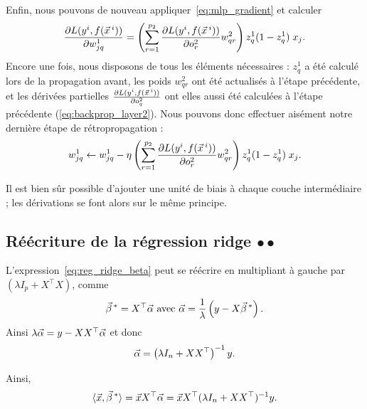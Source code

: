 \begin{exemple}
  Enfin, nous pouvons de nouveau appliquer~\ref{eq:mlp_gradient} et calculer 
  \begin{equation*}
    \frac{\partial L(y^i, f(\xx^i))}{\partial w^1_{jq}} =  
    \left(\sum_{r=1}^{p_2}  \frac{\partial L(y^i, f(\xx^i))}{\partial o^2_r}  
      w^2_{qr} \right) z^1_q (1 - z^1_q) \; x_j.
  \end{equation*}
  Encore une fois, nous disposons de tous les éléments nécessaires : $z_q^1$
  a été calculé lors de la propagation avant, les poids $w^2_{qr}$ ont été
  actualisés à l'étape précédente, et les dérivées partielles $\frac{\partial
    L(y^i, f(\xx^i))}{\partial o^2_q}$ ont elles aussi été calculées à
  l'étape précédente (\ref{eq:backprop_layer2}). Nous pouvons donc effectuer
  aisément notre dernière étape de rétropropagation :
  \begin{equation*}
    w^1_{jq} \leftarrow w^1_{jq} - \eta \left(\sum_{r=1}^{p_2}  
      \frac{\partial L(y^i, f(\xx^i))}{\partial o^2_r}  
      w^2_{qr} \right) z^1_q (1 - z^1_q) \; x_j.
  \end{equation*}
\end{exemple}


Il est bien sûr possible d'ajouter une unité de biais à chaque couche intermédiaire
; les dérivations se font alors sur le même principe.


\subsection{Réécriture de la régression ridge $\bullet \bullet$}
\label{sec:ridge_rewrite}

L'expression~\eqref{eq:reg_ridge_beta} peut se réécrire en multipliant à gauche
par $\left( \lambda I_p + X^\top X \right)$, comme
\begin{equation*}
  \bbeta^* = X^\top \aalpha \text{ avec }
  \aalpha = \frac1{\lambda} \left(y - X \bbeta^* \right).
\end{equation*}
Ainsi $\lambda \aalpha = y - X X^\top \aalpha$ et donc 
\begin{equation*}
  \aalpha = \left(\lambda I_n + X X^\top \right)^{-1} y.
\end{equation*}

Ainsi, 
\begin{equation*}
  \langle \xx,  \bbeta^* \rangle = \xx X^\top \aalpha = \xx X^\top (\lambda I_n + XX^\top)^{-1} y.
\end{equation*}




